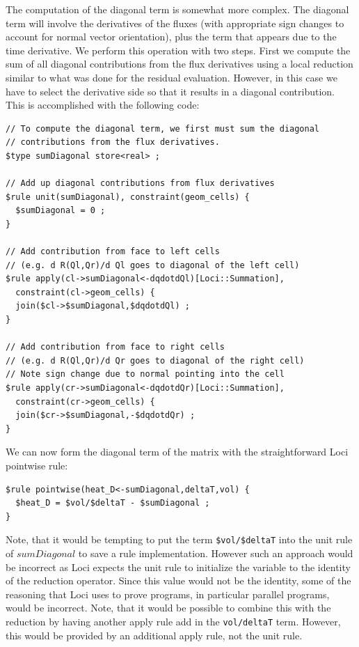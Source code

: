 \documentclass[10pt,epsf,letterpaper,twoside]{book}
\begin{document}
The computation of the diagonal term is somewhat more complex.  The
diagonal term will involve the derivatives of the fluxes (with
appropriate sign changes to account for normal vector orientation),
plus the term that appears due to the time derivative.  We perform
this operation with two steps.  First we compute the sum of all
diagonal contributions from the flux derivatives using a local
reduction similar to what was done for the residual evaluation.
However, in this case we have to select the derivative side so that
it results in a diagonal contribution.  This is accomplished with the
following code:

\begin{verbatim}
// To compute the diagonal term, we first must sum the diagonal
// contributions from the flux derivatives.
$type sumDiagonal store<real> ;

// Add up diagonal contributions from flux derivatives
$rule unit(sumDiagonal), constraint(geom_cells) {
  $sumDiagonal = 0 ;
}

// Add contribution from face to left cells
// (e.g. d R(Ql,Qr)/d Ql goes to diagonal of the left cell)
$rule apply(cl->sumDiagonal<-dqdotdQl)[Loci::Summation],
  constraint(cl->geom_cells) {
  join($cl->$sumDiagonal,$dqdotdQl) ;
}

// Add contribution from face to right cells 
// (e.g. d R(Ql,Qr)/d Qr goes to diagonal of the right cell)
// Note sign change due to normal pointing into the cell
$rule apply(cr->sumDiagonal<-dqdotdQr)[Loci::Summation],
  constraint(cr->geom_cells) {
  join($cr->$sumDiagonal,-$dqdotdQr) ;
}
\end{verbatim}

We can now form the diagonal term of the matrix with the
straightforward Loci pointwise rule:
\begin{verbatim}
$rule pointwise(heat_D<-sumDiagonal,deltaT,vol) {
  $heat_D = $vol/$deltaT - $sumDiagonal ; 
}
\end{verbatim}
Note, that it would be tempting to put the term {\tt \$vol/\$deltaT}
into the unit rule of $sumDiagonal$ to save a rule implementation.
However such an approach would be incorrect as Loci expects the unit
rule to initialize the variable to the identity of the reduction
operator.  Since this value would not be the identity, some of the
reasoning that Loci uses to prove programs, in particular parallel
programs, would be incorrect.  Note, that it would be possible to
combine this with the reduction by having another apply rule add in
the {\tt vol/deltaT} term. However, this would be provided by an
additional apply rule, not the unit rule.
\end{document}
